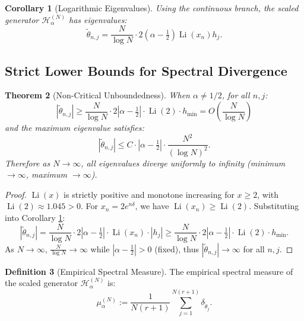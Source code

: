 \documentclass[12pt,a4paper]{amsart}
\theoremstyle{plain}
\newtheorem{theorem}{Theorem}[section]
\newtheorem{corollary}[theorem]{Corollary}
\theoremstyle{definition}
\newtheorem{definition}[theorem]{Definition}
\theoremstyle{remark}
\DeclareMathOperator{\Li}{Li}
\begin{document}
\begin{corollary}[Logarithmic Eigenvalues]\label{cor:log_eig}
Using the continuous branch, the scaled generator $\mathcal{H}_\alpha^{(N)}$ has eigenvalues:
\begin{equation}
\tilde{\theta}_{n,j} = \frac{N}{\log N} \cdot 2(\alpha-\tfrac{1}{2})\Li(x_n)h_j.
\end{equation}
\end{corollary}

\subsection{Strict Lower Bounds for Spectral Divergence}

\begin{theorem}[Non-Critical Unboundedness]\label{thm:unbounded}
When $\alpha \neq 1/2$, for all $n,j$:
\begin{equation}
|\tilde{\theta}_{n,j}| \geq \frac{N}{\log N} \cdot 2|\alpha-\tfrac{1}{2}| \cdot \Li(2) \cdot h_{\min} = O\left(\frac{N}{\log N}\right)
\end{equation}
and the maximum eigenvalue satisfies:
\begin{equation}
|\tilde{\theta}_{n,j}| \leq C \cdot |\alpha-\tfrac{1}{2}| \cdot \frac{N^2}{(\log N)^2}.
\end{equation}
Therefore as $N \to \infty$, all eigenvalues diverge uniformly to infinity (minimum $\to\infty$, maximum $\to\infty$).
\end{theorem}

\begin{proof}
$\Li(x)$ is strictly positive and monotone increasing for $x \geq 2$, with $\Li(2) \approx 1.045 > 0$. For $x_n = 2e^{n\delta}$, we have $\Li(x_n) \geq \Li(2)$. Substituting into Corollary \ref{cor:log_eig}:
\begin{equation}
|\tilde{\theta}_{n,j}| = \frac{N}{\log N} \cdot 2|\alpha-\tfrac{1}{2}| \cdot \Li(x_n) \cdot |h_j| \geq \frac{N}{\log N} \cdot 2|\alpha-\tfrac{1}{2}| \cdot \Li(2) \cdot h_{\min}.
\end{equation}
As $N\to\infty$, $\frac{N}{\log N} \to \infty$ while $|\alpha-\tfrac{1}{2}|>0$ (fixed), thus $|\tilde{\theta}_{n,j}| \to \infty$ for all $n,j$.
\end{proof}

\begin{definition}[Empirical Spectral Measure]\label{def:spec_meas}
The empirical spectral measure of the scaled generator $\mathcal{H}_\alpha^{(N)}$ is:
\begin{equation}
\mu_\alpha^{(N)} := \frac{1}{N(r+1)} \sum_{j=1}^{N(r+1)} \delta_{\tilde{\theta}_j}.
\end{equation}
\end{definition}
\end{document}

